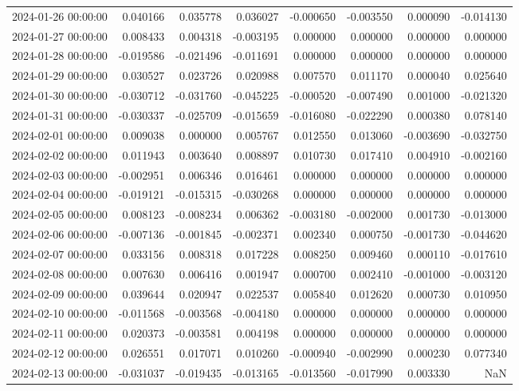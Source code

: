 \begin{tabular}{lrrrrrrr}
2024-01-26 00:00:00 & 0.040166 & 0.035778 & 0.036027 & -0.000650 & -0.003550 & 0.000090 & -0.014130 \\
2024-01-27 00:00:00 & 0.008433 & 0.004318 & -0.003195 & 0.000000 & 0.000000 & 0.000000 & 0.000000 \\
2024-01-28 00:00:00 & -0.019586 & -0.021496 & -0.011691 & 0.000000 & 0.000000 & 0.000000 & 0.000000 \\
2024-01-29 00:00:00 & 0.030527 & 0.023726 & 0.020988 & 0.007570 & 0.011170 & 0.000040 & 0.025640 \\
2024-01-30 00:00:00 & -0.030712 & -0.031760 & -0.045225 & -0.000520 & -0.007490 & 0.001000 & -0.021320 \\
2024-01-31 00:00:00 & -0.030337 & -0.025709 & -0.015659 & -0.016080 & -0.022290 & 0.000380 & 0.078140 \\
2024-02-01 00:00:00 & 0.009038 & 0.000000 & 0.005767 & 0.012550 & 0.013060 & -0.003690 & -0.032750 \\
2024-02-02 00:00:00 & 0.011943 & 0.003640 & 0.008897 & 0.010730 & 0.017410 & 0.004910 & -0.002160 \\
2024-02-03 00:00:00 & -0.002951 & 0.006346 & 0.016461 & 0.000000 & 0.000000 & 0.000000 & 0.000000 \\
2024-02-04 00:00:00 & -0.019121 & -0.015315 & -0.030268 & 0.000000 & 0.000000 & 0.000000 & 0.000000 \\
2024-02-05 00:00:00 & 0.008123 & -0.008234 & 0.006362 & -0.003180 & -0.002000 & 0.001730 & -0.013000 \\
2024-02-06 00:00:00 & -0.007136 & -0.001845 & -0.002371 & 0.002340 & 0.000750 & -0.001730 & -0.044620 \\
2024-02-07 00:00:00 & 0.033156 & 0.008318 & 0.017228 & 0.008250 & 0.009460 & 0.000110 & -0.017610 \\
2024-02-08 00:00:00 & 0.007630 & 0.006416 & 0.001947 & 0.000700 & 0.002410 & -0.001000 & -0.003120 \\
2024-02-09 00:00:00 & 0.039644 & 0.020947 & 0.022537 & 0.005840 & 0.012620 & 0.000730 & 0.010950 \\
2024-02-10 00:00:00 & -0.011568 & -0.003568 & -0.004180 & 0.000000 & 0.000000 & 0.000000 & 0.000000 \\
2024-02-11 00:00:00 & 0.020373 & -0.003581 & 0.004198 & 0.000000 & 0.000000 & 0.000000 & 0.000000 \\
2024-02-12 00:00:00 & 0.026551 & 0.017071 & 0.010260 & -0.000940 & -0.002990 & 0.000230 & 0.077340 \\
2024-02-13 00:00:00 & -0.031037 & -0.019435 & -0.013165 & -0.013560 & -0.017990 & 0.003330 & NaN \\

\end{tabular}

